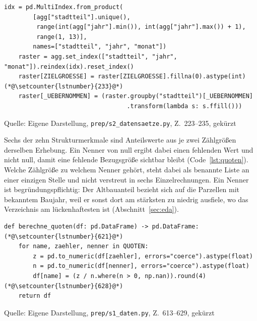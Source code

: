 \documentclass[12pt,a4paper]{article}
\newcommand{\tabquelle}[1][Eigene Darstellung]{%
  \par\setlength{\parskip}{0pt}\vspace{3pt}%
  {\setstretch{1}\fontsize{9pt}{11pt}\selectfont\raggedright Quelle: #1\par}%
}
\begin{document}
\begin{quellcode}[htbp]
\caption{Vollständiges Raster und Vorwärtsfüllen}
\label{lst:raster}\vspace{-3.5pt}
\begin{lstlisting}[style=pythonstil,firstnumber=223]
    idx = pd.MultiIndex.from_product(
        [agg["stadtteil"].unique(),
         range(int(agg["jahr"].min()), int(agg["jahr"].max()) + 1),
         range(1, 13)],
        names=["stadtteil", "jahr", "monat"])
    raster = agg.set_index(["stadtteil", "jahr", "monat"]).reindex(idx).reset_index()
    raster[ZIELGROESSE] = raster[ZIELGROESSE].fillna(0).astype(int)(*@\setcounter{lstnumber}{233}@*)
    raster[_UEBERNOMMEN] = (raster.groupby("stadtteil")[_UEBERNOMMEN]
                                  .transform(lambda s: s.ffill()))
\end{lstlisting}
\tabquelle[Eigene Darstellung, \texttt{prep/s2\_datensaetze.py}, Z.~223--235, gekürzt]
\end{quellcode}
 
Sechs der zehn Strukturmerkmale sind Anteilswerte aus je zwei Zählgrößen
derselben Erhebung. Ein Nenner von null ergibt dabei einen fehlenden Wert und
nicht null, damit eine fehlende Bezugsgröße sichtbar bleibt
(Code~\ref{lst:quoten}). Welche Zählgröße zu welchem Nenner gehört, steht dabei als benannte Liste an einer einzigen Stelle und nicht verstreut in sechs Einzelrechnungen. Ein Nenner ist begründungspflichtig: Der
Altbauanteil bezieht sich auf die Parzellen mit bekanntem Baujahr, weil er
sonst dort am stärksten zu niedrig ausfiele, wo das Verzeichnis am
lückenhaftesten ist (Abschnitt~\ref{sec:eda}).
 
\begin{quellcode}[htbp]
\caption{Anteilswerte aus Zählvariablen}
\label{lst:quoten}\vspace{-3.5pt}
\begin{lstlisting}[style=pythonstil,firstnumber=613]
def berechne_quoten(df: pd.DataFrame) -> pd.DataFrame:(*@\setcounter{lstnumber}{621}@*)
    for name, zaehler, nenner in QUOTEN:
        z = pd.to_numeric(df[zaehler], errors="coerce").astype(float)
        n = pd.to_numeric(df[nenner], errors="coerce").astype(float)
        df[name] = (z / n.where(n > 0, np.nan)).round(4)(*@\setcounter{lstnumber}{628}@*)
    return df
\end{lstlisting}
\tabquelle[Eigene Darstellung, \texttt{prep/s1\_daten.py}, Z.~613--629, gekürzt]
\end{quellcode}
 
\end{document}
